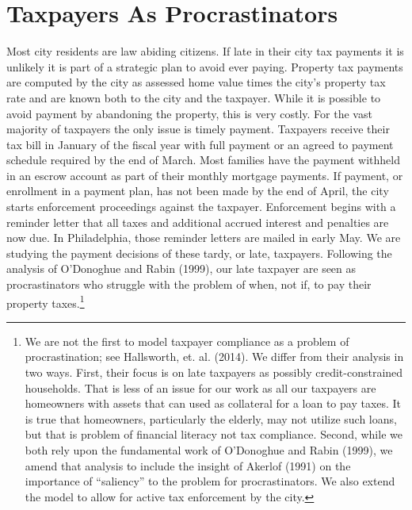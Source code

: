 
\section{Taxpayers As Procrastinators}

Most city residents are law abiding citizens.  If late in their city
tax payments it is unlikely it is part of a strategic plan to avoid
ever paying.  Property tax payments are computed by the city as assessed
home value times the city's property tax rate and are known both to
the city and the taxpayer.  While it is possible to avoid payment by
abandoning the property, this is very costly.  For the vast majority
of taxpayers the only issue is timely payment.  Taxpayers receive
their tax bill in January of the fiscal year with full payment or an
agreed to payment schedule required by the end of March.  Most
families have the payment withheld in an escrow account as part of
their monthly mortgage payments.  If payment, or enrollment in a
payment plan, has not been made by the end of April, the city starts
enforcement proceedings against the taxpayer.  Enforcement begins with
a reminder letter that all taxes and additional accrued interest and
penalties are now due.  In Philadelphia, those reminder letters are
mailed in early May.  We are studying the payment decisions of these
tardy, or late, taxpayers. Following the analysis of O'Donoghue
and Rabin (1999), our late taxpayer are seen as procrastinators who
struggle with the problem of when, not if, to pay their property
taxes.\footnote{We are not the first to model taxpayer compliance as a
  problem of procrastination; see Hallsworth, et. al.  (2014). We
  differ from their analysis in two ways.  First, their focus is on
  late taxpayers as possibly credit-constrained households.  That is
  less of an issue for our work as all our taxpayers are homeowners
  with assets that can used as collateral for a loan to pay taxes.  It
  is true that homeowners, particularly the elderly, may not utilize
  such loans, but that is problem of financial literacy not tax
  compliance.  Second, while we both rely upon the fundamental work of
  O'Donoghue and Rabin (1999), we amend that analysis to include the
  insight of Akerlof (1991) on the importance of ``saliency'' to the
  problem for procrastinators. We also extend the model to allow for
  active tax enforcement by the city.}

